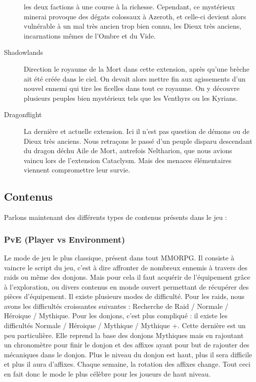 \documentclass{article}
\begin{document}
\begin{description}
        les deux factions à une course à la richesse. Cependant, ce mystérieux minerai
        provoque des dégats colossaux à Azeroth, et celle-ci devient alors vulnérable
        à un mal très ancien trop bien connu, les Dieux très anciens, incarnations mêmes de
        l'Ombre et du Vide.
    \item[Shadowlands] Direction le royaume de la Mort dans cette extension, après qu'une
        brèche ait été créée dans le ciel. On devait alors mettre fin aux agissements
        d'un nouvel ennemi qui tire les ficelles dans tout ce royaume. On y découvre plusieurs
        peuples bien mystérieux tels que les Venthyrs ou les Kyrians.
    \item[Dragonflight] La dernière et actuelle extension. Ici il n'est pas question de
        démons ou de Dieux très anciens. Nous retraçons le passé d'un peuple disparu descendant
        du dragon déchu Aile de Mort, autrefois Neltharion, que nous avions vaincu lors de
        l'extension Cataclysm. Mais des menaces élémentaires viennent compromettre leur
        survie.
\end{description}

\subsection{Contenus}

Parlons maintenant des différents types de contenus présents dans le jeu :

\subsubsection{PvE (Player vs Environment)}

Le mode de jeu le plus classique, présent dans tout MMORPG. Il consiste à vaincre le script
du jeu, c'est à dire affronter de nombreux ennemis à travers des raids ou même des
donjons. Mais pour cela il faut acquérir de l'équipement grâce à l'exploration, ou divers
contenus en monde ouvert permettant de récupérer des pièces d'équipement.\newline
Il existe plusieurs modes de difficulté. Pour les raids, nous avons les difficultés
croissantes suivantes : Recherche de Raid / Normale / Héroique / Mythique. Pour les donjons,
c'est plus compliqué : il existe les difficultés Normale / Héroique / Mythique / Mythique +.
Cette dernière est un peu particulière. Elle reprend la base des donjons Mythiques mais
en rajoutant un chronomètre pour finir le donjon et des affixes ayant pour but de
rajouter des mécaniques dans le donjon. Plus le niveau du donjon est haut, plus il sera
difficile et plus il aura d'affixes. Chaque semaine, la rotation des affixes change.\newline
Tout ceci en fait donc le mode le plus célèbre pour les joueurs de haut niveau.
\end{document}

